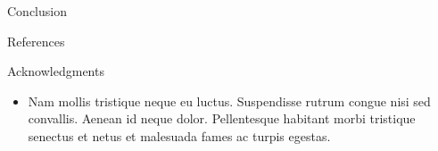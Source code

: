 \documentclass[final,hyperref={pdfpagelabels=false}]{beamer}
\begin{document}
\begin{frame}[t]
\begin{columns}[t]
\begin{column}{.465\textwidth}
\begin{block}{Conclusion}
\end{block}


\begin{block}{References}
        
\nocite{*} %
\small{
}

\end{block}


\begin{block}{Acknowledgments}

\begin{itemize}
\item Nam mollis tristique neque eu luctus. Suspendisse rutrum congue nisi sed convallis. Aenean id neque dolor. Pellentesque habitant morbi tristique senectus et netus et malesuada fames ac turpis egestas.
\end{itemize}

\end{block}







\end{column} %

\begin{column}{.015\textwidth}\end{column} %

\end{columns} %

\end{frame} %
\end{document}
